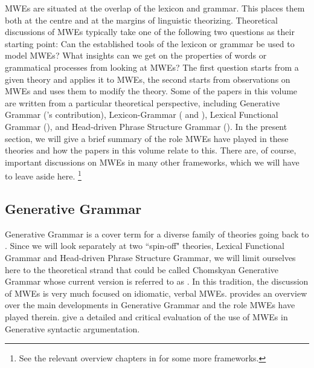 \documentclass[output=paper]{langsci/langscibook}
\begin{document}
MWEs are situated at the overlap of the lexicon and grammar. This places them both at the centre and at the margins of linguistic theorizing. Theoretical discussions of MWEs typically take one of the following two questions as their starting point: Can the established tools of the lexicon or grammar be used to model MWEs? What insights can we get on the properties of words or grammatical processes from looking at MWEs? The first question starts from a given theory and applies it to MWEs, the second starts from observations on MWEs and uses them to modify the theory.
Some of the papers in this volume are written from a particular theoretical perspective, including Generative Grammar (\citeauthor{Kuiper2018tv}’s contribution), Lexicon-Grammar (\citeauthor{Laporte2018tv}
and \citeauthor{FotopoulouGiouli2018tv}),
Lexical Functional Grammar (\citeauthor{MarkantonatouSamaridi2018tv}),
and Head-driven Phrase Structure Grammar (\citeauthor{BargmannSailer2018tv}).
In the present section, we will give a brief summary of the role MWEs have played in these theories and how the papers in this volume relate to this. There are, of course, important discussions on MWEs in many other frameworks, which we will have to leave aside here.%
\footnote{See the relevant overview chapters in  \cite{Burger:al:07.2} for some more frameworks.}

\subsection{Generative Grammar} \label{Sec-GG}
\largerpage
{}
Generative Grammar is a cover term for a diverse family of theories going back to \cite{Chomsky1957}. Since we will look separately at two ``spin-off" theories, Lexical Functional Grammar and Head-driven Phrase Structure Grammar, we will limit ourselves here to the theoretical strand that could be called Chomskyan Generative Grammar whose current version is referred to as  \citep{Chomsky:95}. In this tradition, the discussion of MWEs is very much focused on idiomatic, verbal MWEs.  \cite{Kuiper:04} provides an overview over the main developments in Generative Grammar and the role MWEs have played therein. \cite{Nunberg1994} give a detailed and critical evaluation of the use of MWEs in Generative syntactic argumentation. 
\end{document}
